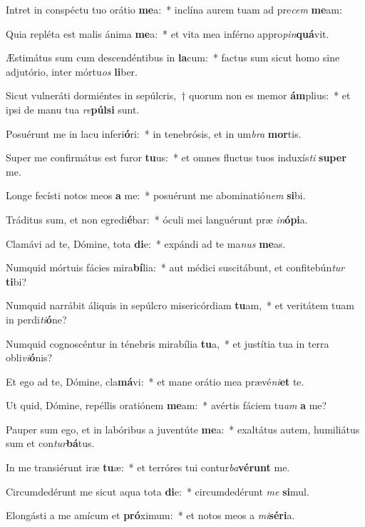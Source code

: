 \item Intret in conspéctu tuo orátio \textbf{me}a:~* inclína aurem tuam ad pre\textit{cem} \textbf{me}am:
\item Quia repléta est malis ánima \textbf{me}a:~* et vita mea inférno appro\textit{pin}\textbf{quá}vit.
\item Æstimátus sum cum descendéntibus in \textbf{la}cum:~* factus sum sicut homo sine adjutório, inter mórtu\textit{os} \textbf{li}ber.
\item Sicut vulneráti dormiéntes in sepúlcris,~† quorum non es memor \textbf{ám}plius:~* et ipsi de manu tua \textit{re}\textbf{púl}\textbf{si} sunt.
\item Posuérunt me in lacu inferi\textbf{ó}ri:~* in tenebrósis, et in um\textit{bra} \textbf{mor}tis.
\item Super me confirmátus est furor \textbf{tu}us:~* et omnes fluctus tuos induxís\textit{ti} \textbf{su}\textbf{per} me.
\item Longe fecísti notos meos \textbf{a} me:~* posuérunt me abominatió\textit{nem} \textbf{si}bi.
\item Tráditus sum, et non egredi\textbf{é}bar:~* óculi mei languérunt præ \textit{in}\textbf{ó}\textbf{pi}a.
\item Clamávi ad te, Dómine, tota \textbf{di}e:~* expándi ad te ma\textit{nus} \textbf{me}as.
\item Numquid mórtuis fácies mira\textbf{bí}lia:~* aut médici suscitábunt, et confitebún\textit{tur} \textbf{ti}bi?
\item Numquid narrábit áliquis in sepúlcro misericórdiam \textbf{tu}am,~* et veritátem tuam in perdi\textit{ti}\textbf{ó}ne?
\item Numquid cognoscéntur in ténebris mirabília \textbf{tu}a,~* et justítia tua in terra obli\textit{vi}\textbf{ó}nis?
\item Et ego ad te, Dómine, cla\textbf{má}vi:~* et mane orátio mea prævé\textit{ni}\textbf{et} te.
\item Ut quid, Dómine, repéllis oratiónem \textbf{me}am:~* avértis fáciem tu\textit{am} \textbf{a} me?
\item Pauper sum ego, et in labóribus a juventúte \textbf{me}a:~* exaltátus autem, humiliátus sum et con\textit{tur}\textbf{bá}tus.
\item In me transiérunt iræ \textbf{tu}æ:~* et terróres tui contur\textit{ba}\textbf{vé}\textbf{runt} me.
\item Circumdedérunt me sicut aqua tota \textbf{di}e:~* circumdedérunt \textit{me} \textbf{si}mul.
\item Elongásti a me amícum et \textbf{pró}ximum:~* et notos meos a \textit{mi}\textbf{sé}\textbf{ri}a.
